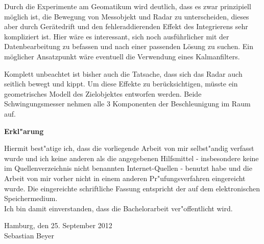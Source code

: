 \documentclass[12pt,a4paper,twoside,BCOR=12.5mm]{scrartcl}
\begin{document}
Durch die Experimente am Geomatikum wird deutlich, dass es zwar prinzipiell möglich ist, die Bewegung von Messobjekt und Radar zu unterscheiden, dieses aber durch Gerätedrift und den fehleraddierenden Effekt des Integrierens sehr kompliziert ist.
Hier wäre es interessant, sich noch ausführlicher mit der Datenbearbeitung zu befassen und nach einer passenden Lösung zu suchen. Ein möglicher Ansatzpunkt wäre eventuell die Verwendung eines Kalmanfilters. \citep[vlg.][]{Filieri:2012kx}

Komplett unbeachtet ist bisher auch die Tatsache, dass sich das Radar auch seitlich bewegt und kippt. Um diese Effekte zu berücksichtigen, müsste ein geometrisches Modell des Zielobjektes entworfen werden. Beide Schwingungsmesser nehmen alle 3 Komponenten der Beschleunigung im Raum auf.



\clearpage
\newpage
\singlespacing
\appendix

%





\clearpage

\noindent
\textbf{Erkl"arung}


Hiermit best"atige ich, dass die vorliegende Arbeit von mir selbst"andig verfasst wurde und ich keine anderen als die angegebenen Hilfsmittel - insbesondere keine im Quellenverzeichnis nicht benannten Internet-Quellen - benutzt habe und die Arbeit von mir vorher nicht in einem anderen Pr"ufungsverfahren eingereicht wurde. Die eingereichte schriftliche Fassung entspricht der auf dem elektronischen Speichermedium.\\


Ich bin damit einverstanden, dass die Bachelorarbeit ver"offentlicht wird.\\

\vspace{\baselineskip}
\vspace{\baselineskip}
\vspace{\baselineskip}

Hamburg, den 25. September 2012\\

Sebastian Beyer
\end{document}
